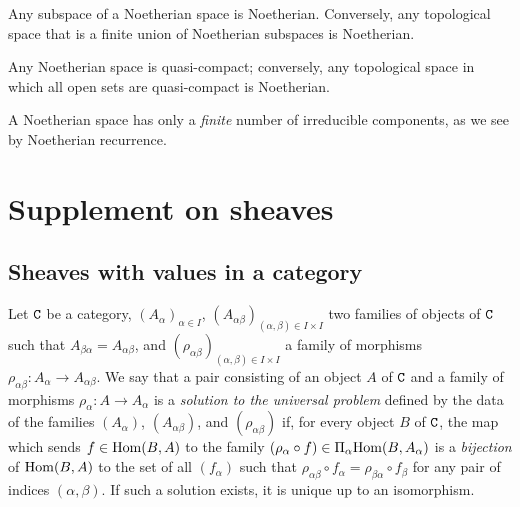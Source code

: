 \begin{env}[2.2.3]
\label{env-0.2.2.3}
Any subspace of a Noetherian space is Noetherian. Conversely, any topological
space that is a finite union of Noetherian subspaces is Noetherian.
\end{env}

\begin{env}[2.2.4]
\label{env-0.2.2.4}
Any Noetherian space is quasi-compact; conversely, any topological space in
which all open sets are quasi-compact is Noetherian.
\end{env}

\begin{env}[2.2.5]
\label{env-0.2.2.5}
A Noetherian space has only a {\em finite} number of irreducible components, as
we see by Noetherian recurrence.
\end{env}

\section{Supplement on sheaves}
\label{section-supplement-on-sheaves}

\subsection{Sheaves with values in a category}
\label{subsection-sheaves-with-values-in-cat}

\begin{env}[3.1.1]
\label{env-0.3.1.1}
Let $\mathtt{C}$ be a category, $(A_\alpha)_{\alpha\in I}$,
$(A_{\alpha\beta})_{(\alpha,\beta)\in I\times I}$ two families of objects of
$\mathtt{C}$ such that $A_{\beta\alpha}=A_{\alpha\beta}$, and
$(\rho_{\alpha\beta})_{(\alpha,\beta)\in I\times I}$ a family of morphisms
$\rho_{\alpha\beta}:A_\alpha\to A_{\alpha\beta}$. We say that a pair consisting
of an object $A$ of $\mathtt{C}$ and a family of morphisms $\rho_\alpha:A\to A_\alpha$
is a {\em solution to the universal problem} defined by the data of the
families $(A_\alpha)$, $(A_{\alpha\beta})$, and $(\rho_{\alpha\beta})$ if, for
every object $B$ of $\mathtt{C}$, the map which sends $f\in{\mathop{\mathrm{Hom}}\nolimits}(B,A)$ to the family
$(\rho_\alpha\circ f)\in\Pi_\alpha{\mathop{\mathrm{Hom}}\nolimits}(B,A_\alpha)$ is a {\em bijection} of
${\mathop{\mathrm{Hom}}\nolimits}(B,A)$ to the set of all $(f_\alpha)$ such that
$\rho_{\alpha\beta}\circ f_\alpha=\rho_{\beta\alpha}\circ f_\beta$ for any pair
of indices $(\alpha,\beta)$. If such a solution exists, it is unique up to an
isomorphism.
\end{env}

